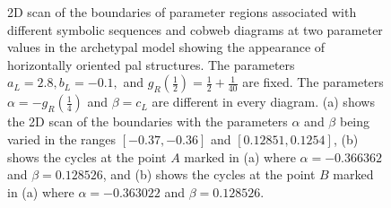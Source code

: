 \begin{figure}
	\centering
	\caption[2D scan of the boundaries of parameter regions associated with different symbolic sequences and cobweb diagrams at two parameter values in the archetypal model showing the appearance of horizontally oriented period-adding-like structures]{
		2D scan of the boundaries of parameter regions associated with different symbolic sequences and cobweb diagrams at two parameter values in the archetypal model showing the appearance of horizontally oriented \gls{pal} structures.
		The parameters $a_L = 2.8, b_L = -0.1,$ and $g_R\left(\frac{1}{2}\right) = \frac{1}{2} + \frac{1}{40}$ are fixed.
		The parameters $\alpha = -g_R\left(\frac{1}{4}\right)$ and $\beta = c_L$ are different in every diagram.
		(a) shows the 2D scan of the boundaries with the parameters $\alpha$ and $\beta$ being varied in the ranges $[-0.37, -0.36]$ and $[0.12851, 0.1254]$,
		(b) shows the cycles at the point $A$ marked in (a) where $\alpha = -0.366362$ and $\beta = 0.128526$,
		and (b) shows the cycles at the point $B$ marked in (a) where $\alpha = -0.363022$ and $\beta = 0.128526$.
	}
\end{figure}

